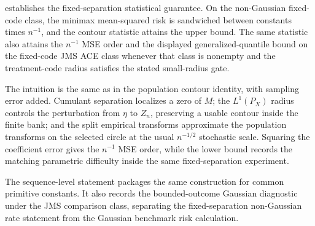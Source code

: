  establishes the fixed-separation statistical guarantee. On the non-Gaussian fixed-code class, the minimax mean-squared risk is sandwiched between constants times \(n^{-1}\), and the contour statistic attains the upper bound. The same statistic also attains the \(n^{-1}\) MSE order and the displayed generalized-quantile bound on the fixed-code JMS ACE class whenever that class is nonempty and the treatment-code radius satisfies the stated small-radius gate.

The intuition is the same as in the population contour identity, with sampling error added. Cumulant separation localizes a zero of \(M\); the \(L^1(P_X)\) radius controls the perturbation from \(\eta\) to \(Z_n\), preserving a usable contour inside the finite bank; and the split empirical transforms approximate the population transforms on the selected circle at the usual \(n^{-1/2}\) stochastic scale. Squaring the coefficient error gives the \(n^{-1}\) MSE order, while the lower bound records the matching parametric difficulty inside the same fixed-separation experiment.

The sequence-level statement packages the same construction for common primitive constants. It also records the bounded-outcome Gaussian diagnostic under the JMS comparison class, separating the fixed-separation non-Gaussian rate statement from the Gaussian benchmark risk calculation.

